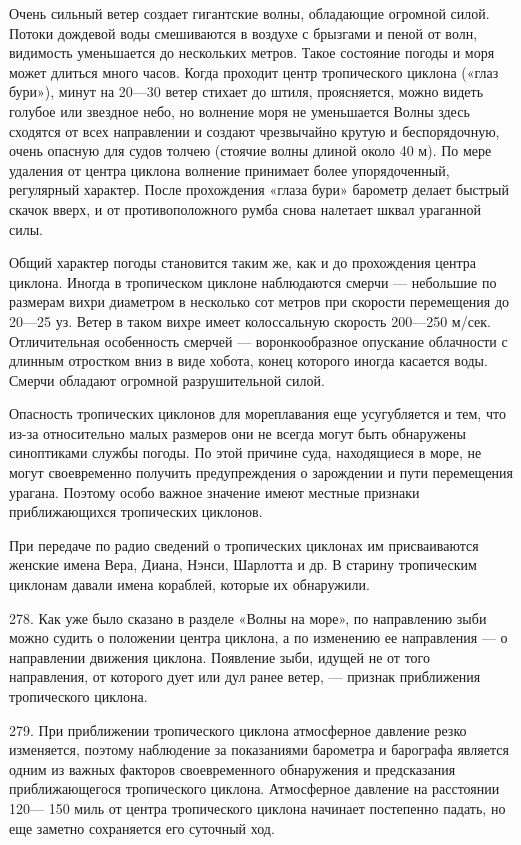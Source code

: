 Очень сильный ветер создает гигантские волны, обладающие огромной силой. Потоки дождевой воды смешиваются в воздухе с брызгами и пеной от волн, видимость уменьшается до нескольких метров. Такое состояние погоды и моря может длиться много часов. Когда проходит центр тропического циклона («глаз бури»), минут на 20—30 ветер стихает до штиля, проясняется, можно видеть голубое или звездное небо, но волнение моря не уменьшается Волны здесь сходятся от всех направлении и создают чрезвычайно крутую и беспорядочную, очень опасную для судов толчею (стоячие волны длиной около 40 м). По мере удаления от центра циклона волнение принимает более упорядоченный, регулярный характер. После прохождения «глаза бури» барометр делает быстрый скачок вверх, и от противоположного румба снова налетает шквал ураганной силы.

Общий характер погоды становится таким же, как и до прохождения центра циклона. Иногда в тропическом циклоне наблюдаются смерчи — небольшие по размерам вихри диаметром в несколько сот метров при скорости перемещения до 20—25 уз. Ветер в таком вихре имеет колоссальную скорость 200—250 м/сек. Отличительная особенность смерчей — воронкообразное опускание облачности с длинным отростком вниз в виде хобота, конец которого иногда касается воды. Смерчи обладают огромной разрушительной силой.

Опасность тропических циклонов для мореплавания еще усугубляется и тем, что из-за относительно малых размеров они не всегда могут быть обнаружены синоптиками службы погоды. По этой причине суда, находящиеся в море, не могут своевременно получить предупреждения о зарождении и пути перемещения урагана. Поэтому особо важное значение имеют местные признаки приближающихся тропических циклонов.

При передаче по радио сведений о тропических циклонах им присваиваются женские имена Вера, Диана, Нэнси, Шарлотта и др. В старину тропическим циклонам давали имена кораблей, которые их обнаружили.

278. Как уже было сказано в разделе «Волны на море», по направлению зыби можно судить о положении центра циклона, а по изменению ее направления — о направлении движения циклона. Появление зыби, идущей не от того направления, от которого дует или дул ранее ветер, — признак приближения тропического циклона.

279. При приближении тропического циклона атмосферное давление резко изменяется, поэтому наблюдение за показаниями барометра и барографа является одним из важных факторов своевременного обнаружения и предсказания приближающегося тропического циклона. Атмосферное давление на расстоянии 120— 150 миль от центра тропического циклона начинает постепенно падать, но еще заметно сохраняется его суточный ход.

